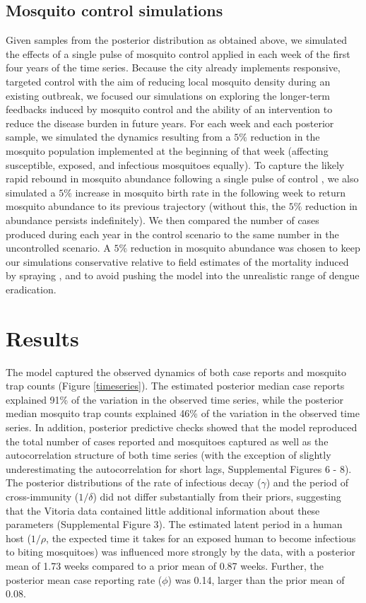 \documentclass[10pt,letterpaper]{article}
\begin{document}
\subsection*{Mosquito control simulations}

Given samples from the posterior distribution as obtained above, we simulated the effects of a single pulse of mosquito control applied in each week of the first four years of the time series.
Because the city already implements responsive, targeted control with the aim of reducing local mosquito density during an existing outbreak, we focused our simulations on exploring the longer-term feedbacks induced by mosquito control and the ability of an intervention to reduce the disease burden in future years.
For each week and each posterior sample, we simulated the dynamics resulting from a $5\%$ reduction in the mosquito population implemented at the beginning of that week (affecting susceptible, exposed, and infectious mosquitoes equally).
To capture the likely rapid rebound in mosquito abundance following a single pulse of control \cite{Focks1987, Burattini2008}, we also simulated a $5\%$ increase in mosquito birth rate in the following week to return mosquito abundance to its previous trajectory (without this, the $5\%$ reduction in abundance persists indefinitely).
We then compared the number of cases produced during each year in the control scenario to the same number in the uncontrolled scenario.
A $5\%$ reduction in mosquito abundance was chosen to keep our simulations conservative relative to field estimates of the mortality induced by spraying \cite{Esu2010}, and to avoid pushing the model into the unrealistic range of dengue eradication.

\section*{Results}

The model captured the observed dynamics of both case reports and mosquito trap counts (Figure \ref{timeseries}).
The estimated posterior median case reports explained 91\% of the variation in the observed time series, while the posterior median mosquito trap counts explained 46\% of the variation in the observed time series. 
In addition, posterior predictive checks showed that the model reproduced the total number of cases reported and mosquitoes captured as well as the autocorrelation structure of both time series (with the exception of slightly underestimating the autocorrelation for short lags, Supplemental Figures 6 - 8).
The posterior distributions of the rate of infectious decay ($\gamma$) and the period of cross-immunity ($1/\delta$) did not differ substantially from their priors, suggesting that the Vitoria data contained little additional information about these parameters (Supplemental Figure 3).
The estimated latent period in a human host ($1/\rho$, the expected time it takes for an exposed human to become infectious to biting mosquitoes) was influenced more strongly by the data, with a posterior mean of 1.73 weeks compared to a prior mean of 0.87 weeks.
Further, the posterior mean case reporting rate ($\phi$) was 0.14, larger than the prior mean of 0.08.
\end{document}
